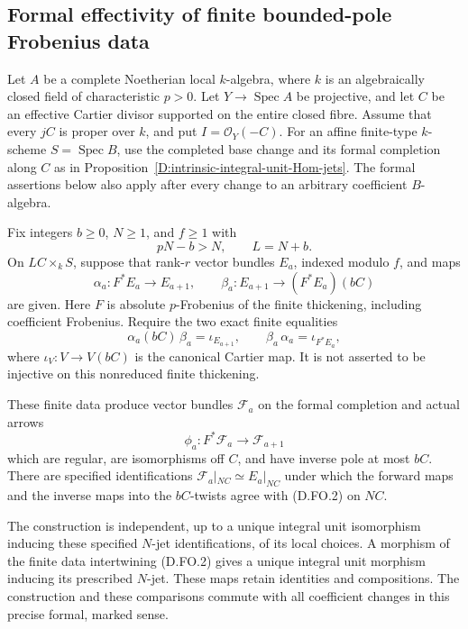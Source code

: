 \subsection{Formal effectivity of finite bounded-pole Frobenius data}

\begin{proposition}
\label{D:finite-Frobenius-object-effectivity}
Let $A$ be a complete Noetherian local $k$-algebra, where $k$
is an algebraically closed field of characteristic $p>0$.
Let $Y\to\operatorname{Spec}A$ be projective, and let $C$ be
an effective Cartier divisor supported on the entire closed
fibre. Assume that every $jC$ is proper over $k$, and put
$I=\mathcal O_Y(-C)$. For an affine finite-type $k$-scheme
$S=\operatorname{Spec}B$, use the completed base change and
its formal completion along $C$ as in
Proposition~\ref{D:intrinsic-integral-unit-Hom-jets}.
The formal assertions below also apply after every change
to an arbitrary coefficient $B$-algebra.

Fix integers $b\ge0$, $N\ge1$, and $f\ge1$ with
\[
                 pN-b>N,\qquad L=N+b.                  \tag{D.FO.1}
\]
On $LC\times_k S$, suppose that rank-$r$ vector bundles
$E_a$, indexed modulo $f$, and maps
\[
 \alpha_a:F^*E_a\longrightarrow E_{a+1},\qquad
 \beta_a:E_{a+1}\longrightarrow (F^*E_a)(bC)             \tag{D.FO.2}
\]
are given. Here $F$ is absolute $p$-Frobenius of the finite
thickening, including coefficient Frobenius. Require the
two exact finite equalities
\[
 \alpha_a(bC)\,\beta_a=\iota_{E_{a+1}},\qquad
 \beta_a\,\alpha_a=\iota_{F^*E_a},                      \tag{D.FO.3}
\]
where $\iota_V:V\to V(bC)$ is the canonical Cartier map.
It is not asserted to be injective on this nonreduced
finite thickening.

These finite data produce vector bundles $\mathcal F_a$
on the formal completion and actual arrows
\[
 \phi_a:F^*\mathcal F_a\longrightarrow\mathcal F_{a+1}
                                                                    \tag{D.FO.4}
\]
which are regular, are isomorphisms off $C$, and have
inverse pole at most $bC$. There are specified
identifications $\mathcal F_a|_{NC}\simeq E_a|_{NC}$
under which the forward maps and the inverse maps into
the $bC$-twists agree with (D.FO.2) on $NC$.

The construction is independent, up to a unique integral
unit isomorphism inducing these specified $N$-jet
identifications, of its local choices. A morphism of the
finite data intertwining (D.FO.2) gives a unique integral
unit morphism inducing its prescribed $N$-jet. These maps
retain identities and compositions. The construction and
these comparisons commute with all coefficient changes
in this precise formal, marked sense.


\end{proposition}
